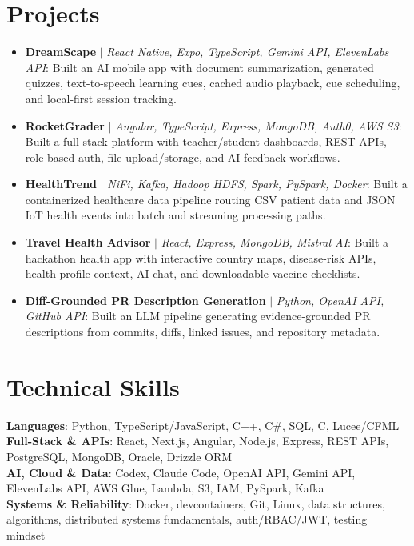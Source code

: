 \documentclass[letterpaper,11pt]{article}
\begin{document}
\section{Projects}
\begin{itemize}[leftmargin=0.15in, label={}, itemsep=-2pt, topsep=0pt, parsep=0pt]
  \item\small{\textbf{DreamScape} $|$ \emph{React Native, Expo, TypeScript, Gemini API, ElevenLabs API}: Built an AI mobile app with document summarization, generated quizzes, text-to-speech learning cues, cached audio playback, cue scheduling, and local-first session tracking.}
  \item\small{\textbf{RocketGrader} $|$ \emph{Angular, TypeScript, Express, MongoDB, Auth0, AWS S3}: Built a full-stack platform with teacher/student dashboards, REST APIs, role-based auth, file upload/storage, and AI feedback workflows.}
  \item\small{\textbf{HealthTrend} $|$ \emph{NiFi, Kafka, Hadoop HDFS, Spark, PySpark, Docker}: Built a containerized healthcare data pipeline routing CSV patient data and JSON IoT health events into batch and streaming processing paths.}
  \item\small{\textbf{Travel Health Advisor} $|$ \emph{React, Express, MongoDB, Mistral AI}: Built a hackathon health app with interactive country maps, disease-risk APIs, health-profile context, AI chat, and downloadable vaccine checklists.}
  \item\small{\textbf{Diff-Grounded PR Description Generation} $|$ \emph{Python, OpenAI API, GitHub API}: Built an LLM pipeline generating evidence-grounded PR descriptions from commits, diffs, linked issues, and repository metadata.}
\end{itemize}\vspace{-7pt}

\section{Technical Skills}
 \begin{itemize}[leftmargin=0.15in, label={}]
    \small{\item{
     \textbf{Languages}{: Python, TypeScript/JavaScript, C++, C\#, SQL, C, Lucee/CFML} \\
     \textbf{Full-Stack \& APIs}{: React, Next.js, Angular, Node.js, Express, REST APIs, PostgreSQL, MongoDB, Oracle, Drizzle ORM} \\
     \textbf{AI, Cloud \& Data}{: Codex, Claude Code, OpenAI API, Gemini API, ElevenLabs API, AWS Glue, Lambda, S3, IAM, PySpark, Kafka} \\
     \textbf{Systems \& Reliability}{: Docker, devcontainers, Git, Linux, data structures, algorithms, distributed systems fundamentals, auth/RBAC/JWT, testing mindset}
    }}
 \end{itemize}
\end{document}
